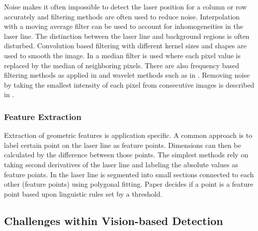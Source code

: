\documentclass[10pt,letter]{article}
\begin{document}
Noise makes it often impossible to detect the laser position for a column or row accurately and filtering methods are often used to reduce noise. Interpolation with a moving average filter \cite{wang2014weld} can be used to account for inhomogeneities in the laser line. The distinction between the laser line and background regions is often disturbed. Convolution based filtering \cite{huang2012development} with different kernel sizes and shapes are used to smooth the image. In \cite{zhang2007vision} a median filter is used where each pixel value is replaced by the median of neighboring pixels. There are also frequency based filtering methods as applied in \cite{uzun2005fpga} and wavelet methods such as in \cite{liu2006image}. Removing noise by taking the smallest intensity of each pixel from consecutive images is described in \cite{li2010measurement}.

\subsubsection{Feature Extraction}
Extraction of geometric features is application specific. A common approach is to label certain point on the laser line as feature points. Dimensions can then be calculated by the difference between those points. The simplest methods \cite{li2010measurement} \cite{huang2012development} rely on taking second derivatives of the laser line and labeling the absolute values as feature points. In \cite{kim1995robust} the laser line is segmented into small sections connected to each other (feature points) using polygonal fitting. Paper \cite{davis2011vision} decides if a point is a feature point based upon linguistic rules set by a threshold. 

\subsection{Challenges within Vision-based Detection}
\end{document}

